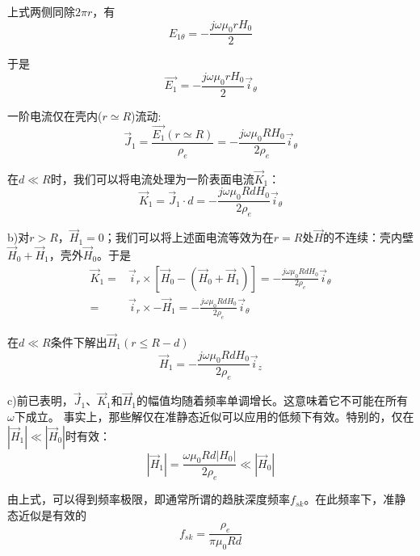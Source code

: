 上式两侧同除$2\pi r$，有
\begin{equation*}
E_{1\theta} = -\frac{j\omega \mu_0 r H_0}{2} \tag{S7.3}
\end{equation*}

于是
\begin{equation*}
\vec{E_{1}} = -\frac{j\omega \mu_0 r H_0}{2}\vec{i}_\theta \tag{2.56}
\end{equation*}

一阶电流仅在壳内($r\simeq R$)流动:
\begin{equation*}
\vec{J}_1=\frac{\vec{E_{1}}(r\simeq R)}{\rho_e} = -\frac{j\omega \mu_0 R H_0}{2\rho_e}\vec{i}_\theta \tag{2.57}
\end{equation*}

在$d\ll R$时，我们可以将电流处理为一阶表面电流$\vec{K}_1$：
\begin{equation*}
\vec{K}_1=\vec{J}_1 \cdot d= -\frac{j\omega \mu_0 R d H_0}{2\rho_e}\vec{i}_\theta \tag{S7.4}
\end{equation*}

b)对$r>R$，$\vec{H}_1=0$；我们可以将上述面电流等效为在$r=R$处$\vec{H}$的不连续：壳内壁$\vec{H}_0+\vec{H}_1$，壳外$\vec{H}_0$。于是
\begin{align}
\vec{K}_1=&\vec{i}_r \times [\vec{H}_0-(\vec{H}_0+\vec{H}_1)]=-\frac{j\omega \mu_0 R d H_0}{2\rho_e}\vec{i}_\theta\nonumber\\
=&\vec{i}_r\times-\vec{H}_1=-\frac{j\omega \mu_0 R d H_0}{2\rho_e}\vec{i}_\theta\nonumber\tag{S7.5}
\end{align}

在$d\ll R$条件下解出$\vec{H}_1(r\le R-d)$
\begin{equation*}
\vec{H}_1=-\frac{j\omega \mu_0 R d H_0}{2\rho_e}\vec{i}_z \tag{2.58}
\end{equation*}

c)前已表明，$\vec{J}_1$、$\vec{K}_1$和$\vec{H}_1$的幅值均随着频率单调增长。这意味着它不可能在所有$\omega$下成立。
事实上，那些解仅在准静态近似可以应用的低频下有效。特别的，仅在$|\vec{H}_1|\ll |\vec{H}_0|$时有效：
\begin{equation*}
|\vec{H}_1|=\frac{\omega \mu_0 R d |H_0|}{2\rho_e}\ll |\vec{H}_0|\tag{S7.6}
\end{equation*}

由上式，可以得到频率极限，即通常所谓的趋肤深度频率$f_{sk}$。在此频率下，准静态近似是有效的
\begin{equation*}
f_{sk}=\frac{\rho_e}{\pi \mu_0 R d} \tag{2.59}
\end{equation*}


